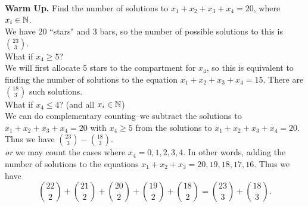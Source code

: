 \documentclass[class=article, crop=false]{standalone}
\begin{document}
  \textbf{Warm Up.} Find the number of solutions to $x_1+x_2+x_3+x_4=20$, where $x_i\in\mathbb{N}$.\\[10pt]
  We have $20$ ``stars" and $3$ bars, so the number of possible solutions to this is $\binom{23}{3}$.\\[10pt]
  What if $x_4\geq 5$? \\[10pt]
  We will first allocate $5$ stars to the compartment for $x_4$, so this is equivalent to finding the number of solutions to the equation $x_1+x_2+x_3+x_4=15$. There are $\binom{18}{3}$ such solutions. \\[10pt]
  What if $x_4\leq 4$? (and all $x_i\in\mathbb{N}$) \\[10pt]
  We can do complementary counting--we subtract the solutions to $x_1+x_2+x_3+x_4=20$ with $x_4\geq 5$ from the solutions to $x_1+x_2+x_3+x_4=20$.
  Thus we have $\binom{23}{3}-\binom{18}{3}$. \\
  \emph{or} we may count the cases where $x_4=0, 1, 2, 3, 4$. In other words, adding the number of solutions to the equations $x_1+x_2+x_3=20,19,18,17,16$. Thus we have
  \[
    \binom{22}{2}+\binom{21}{2}+\binom{20}{2}+\binom{19}{2}+\binom{18}{2}=\binom{23}{3}+\binom{18}{3}.
  \]
\end{document}
